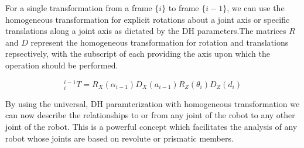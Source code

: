 \noindent For a single transformation from a frame $\{ i\}$ to frame $\{ i-1 \}$, we can use the homogeneous transformation for explicit rotations about a joint axis or specific translations along a joint axis as dictated by the DH parameters.The matrices $R$ and $D$ represent the homogeneous transformation for rotation and translations repsectively, with the subscript of each providing the axis upon which the operation should be performed.


$$
{ }_{i}^{i-1} T=R_{X}\left(\alpha_{i-1}\right) D_{X}\left(a_{i-1}\right) R_{Z}\left(\theta_{i}\right) D_{Z}\left(d_{i}\right)
$$


\noindent By using the universal, DH paramterization with homogeneous transformation we can now describe the relationships to or from any joint of the robot to any other joint of the robot. This is a powerful concept which facilitates the analysis of any robot whose joints are based on revolute or prismatic members.
